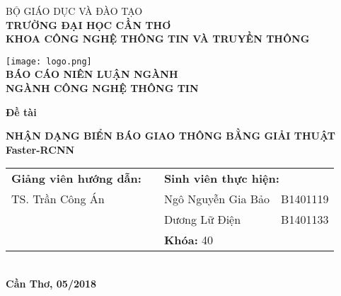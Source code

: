 \documentclass[../thesis.tex]{subfiles}
\begin{document}
\begin{titlepage}

\begin{center}

BỘ GIÁO DỤC VÀ ĐÀO TẠO\\
\textbf{TRƯỜNG ĐẠI HỌC CẦN THƠ\\}
\textbf{KHOA CÔNG NGHỆ THÔNG TIN VÀ TRUYỀN THÔNG\\[1cm]}

\texttt{[image: logo.png]}\\[1cm]

\textbf{BÁO CÁO NIÊN LUẬN NGÀNH\\}
\textbf{NGÀNH CÔNG NGHỆ THÔNG TIN\\[2cm]}

\begin{large}
\textbf{Đề tài\\[0.5cm]}
\end{large}
\textbf{{\LARGE NHẬN DẠNG BIỂN BÁO GIAO THÔNG BẰNG GIẢI THUẬT Faster-RCNN}}
\\[3.5cm]

\begin{tabular}{ l c l l }
	 \textbf{Giảng viên hướng dẫn:} & \hspace{2cm} & \multicolumn{2}{l}{\textbf{Sinh viên thực hiện:}}\\
	 TS. Trần Công Án & & Ngô Nguyễn Gia Bảo &
	 B1401119\\
	 & & Dương Lữ Điện & B1401133\\
	 & & \multicolumn{2}{l}{\textbf{Khóa:} 40}
\end{tabular}
\\[4cm]

\textbf{Cần Thơ, 05/2018}

\end{center}

\end{titlepage}
\end{document}
